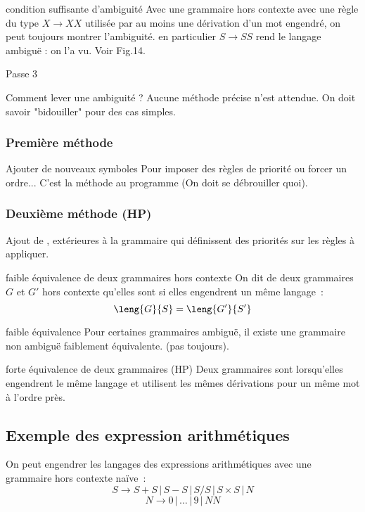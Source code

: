 \begin{adjustwidth}{-3cm}{-3cm}
\begin{remarque}{}{condition suffisante d'ambiguité}
    Avec une grammaire hors contexte avec une règle du type $X \rightarrow XX$ utilisée par au moins une dérivation d'un mot engendré, on peut toujours montrer l'ambiguité. en particulier $S \rightarrow SS$ rend le langage ambiguë : on l'a vu. Voir Fig.14.
\end{remarque}
Passe 3


Comment lever une ambiguité ?
Aucune méthode précise n'est attendue. On doit savoir "bidouiller" pour des cas simples.

\subsubsection{Première méthode}

Ajouter de nouveaux symboles Pour imposer des règles de priorité ou forcer un ordre... C'est la méthode au programme (On doit se débrouiller quoi).

\subsubsection{Deuxième méthode (HP)}
Ajout de , extérieures à la grammaire qui définissent des priorités sur les règles à appliquer.\\

\begin{definition}{}{faible équivalence de deux grammaires hors contexte}
    On dit de deux grammaires $G$ et $G'$ hors contexte qu'elles sont  si elles engendrent un même langage~:
    $$\leng{G}{S} = \leng{G'}{S'}$$
\end{definition}

\begin{remarque}{}{faible équivalence}
    Pour certaines grammaires ambiguë, il existe une grammaire non ambiguë faiblement équivalente. (pas toujours).
\end{remarque}

\begin{definition}{}{forte équivalence de deux grammaires (HP)}
    Deux grammaires sont  lorsqu'elles engendrent le même langage et utilisent les mêmes dérivations pour un même mot à l'ordre près.
\end{definition}

\subsection{Exemple des expression arithmétiques}
On peut engendrer les langages des expressions arithmétiques avec une grammaire hors contexte naïve~:
$$S \rightarrow S + S \,\vert\, S - S \,\vert\, S / S \,\vert\, S \times S \,\vert\, N$$
$$N \rightarrow  0 \,\vert\, \dots \,\vert\, 9 \,\vert\, NN$$


\end{adjustwidth}
